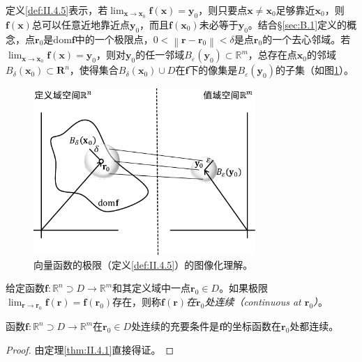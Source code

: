 \documentclass[main.tex]{subfiles}
\begin{document}
定义\ref{def:II.4.5}表示，若$\lim_{\mathbf{x}\to\mathbf{x}_0}\mathbf{f}\left(\mathbf{x}\right)=\mathbf{y}_0$，则只要点$\mathbf{x}\neq\mathbf{x}_0$足够靠近$\mathbf{x}_0$，则$\mathbf{f}\left(\mathbf{x}\right)$总可以任意近地靠近点$\mathbf{y}_0$，而且$\mathbf{f}\left(\mathbf{x}_0\right)$未必等于$\mathbf{y}_0$。结合\S\ref{sec:B.1}定义的概念，点$\mathbf{r}_0$是$\mathrm{dom}\mathbf{f}$中的一个极限点，$0<\left\|\mathbf{r}-\mathbf{r}_0\right\|<\delta$是点$\mathbf{r}_0$的一个去心邻域。若$\lim_{\mathbf{x}\to\mathbf{x}_0}\mathbf{f}\left(\mathbf{x}\right)=\mathbf{y}_0$，则对$\mathbf{y}_0$的任一邻域$B_\varepsilon\left(\mathbf{y}_0\right)\subset\mathbb{R}^m$，总存在点$\mathbf{x}_0$的邻域$B_\delta\left(\mathbf{x}_0\right)\subset \mathbf{R}^n$，使得集合$B_\delta\left(\mathbf{x}_0\right)\cup D$在$\mathbf{f}$下的像集是$B_\varepsilon\left(\mathbf{y}_0\right)$的子集（如图\ref{fig:II.4.6}）。

\begin{figure}[h]
    \centering
    \includegraphics[width=0.75\textwidth]{images/II.4.6.pdf}
    \caption{向量函数的极限（定义\ref{def:II.4.5}）的图像化理解。}
    \label{fig:II.4.6}
\end{figure}

\begin{definition}[函数的连续性]\label{def:II.4.6}
    给定函数$\mathbf{f}:\mathbb{R}^n\supset D\rightarrow\mathbb{R}^m$和其定义域中一点$\mathbf{r}_0\in D$。如果极限$\lim_{\mathbf{r}\to\mathbf{r}_0}\mathbf{f}\left(\mathbf{r}\right)=\mathbf{f}\left(\mathbf{r}_0\right)$存在，则称$\mathbf{f}\left(\mathbf{r}\right)$\emph{在$\mathbf{r}_0$处连续（continuous at $\mathbf{r}_0$）}。
\end{definition}

\begin{theorem}\label{thm:II.4.2}
    函数$\mathbf{f}:\mathbb{R}^n\supset D\rightarrow\mathbb{R}^m$在$\mathbf{r}_0\in D$处连续的充要条件是$\mathbf{f}$的坐标函数在$\mathbf{r}_0$处都连续。
\end{theorem}
\begin{proof}
    由定理\ref{thm:II.4.1}直接得证。
\end{proof}
\end{document}
